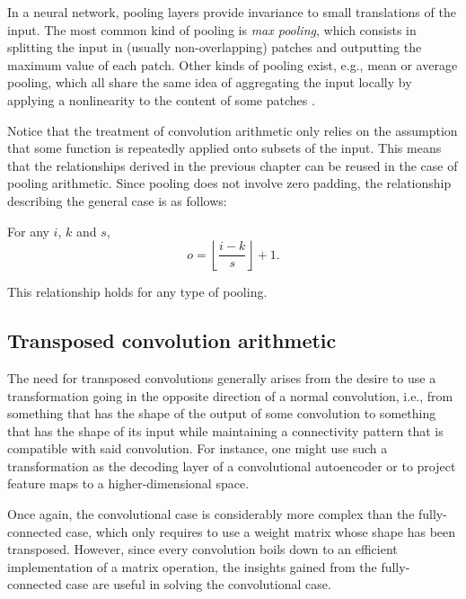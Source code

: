 In a neural network, pooling layers provide invariance to small translations of
the input. The most common kind of pooling is \emph{max pooling}, which
consists in splitting the input in (usually non-overlapping) patches and
outputting the maximum value of each patch. Other kinds of pooling exist, e.g.,
mean or average pooling, which all share the same idea of aggregating the input
locally by applying a nonlinearity to the content of some patches \citep{%
boureau-cvpr-10,boureau-icml-10,boureau-iccv-11,ICML2011Saxe_551}.

Notice that the treatment of convolution arithmetic only relies on the
assumption that some function is repeatedly applied onto subsets of the input.
This means that the relationships derived in the previous chapter can be reused
in the case of pooling arithmetic. Since pooling does not involve zero padding,
the relationship describing the general case is as follows:

\begin{relationship}\label{rel:pooling}
For any $i$, $k$ and $s$,
\begin{equation*}
    o = \left\lfloor \frac{i - k}{s} \right\rfloor + 1.
\end{equation*}
\end{relationship}

\noindent This relationship holds for any type of pooling.

\subsection{Transposed convolution arithmetic}\label{sec:transposed_conv}

The need for transposed convolutions generally arises from the desire to use a
transformation going in the opposite direction of a normal convolution, i.e.,
from something that has the shape of the output of some convolution to
something that has the shape of its input while maintaining a connectivity
pattern that is compatible with said convolution. For instance, one might use
such a transformation as the decoding layer of a convolutional autoencoder or to
project feature maps to a higher-dimensional space.

\sloppy
Once again, the convolutional case is considerably more complex than the
fully-connected case, which only requires to use a weight matrix whose shape
has been transposed. However, since every convolution boils down to an
efficient implementation of a matrix operation, the insights gained from the
fully-connected case are useful in solving the convolutional case.

